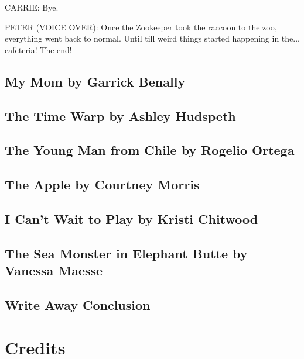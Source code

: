 CARRIE:
Bye.

PETER (VOICE OVER):
Once the Zookeeper took the raccoon to the zoo, everything went back to normal.
Until till weird things started happening in the... cafeteria!
The end!

\subsection{My Mom by Garrick Benally}

\subsection{The Time Warp by Ashley Hudspeth}

\subsection{The Young Man from Chile by Rogelio Ortega}

\subsection{The Apple by Courtney Morris}

\subsection{I Can't Wait to Play by Kristi Chitwood}

\subsection{The Sea Monster in Elephant Butte by Vanessa Maesse}

\subsection{Write Away Conclusion}

\section{Credits}